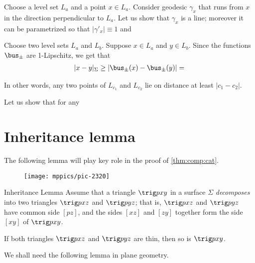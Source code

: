 Choose a level set $L_a$ and a point $x\in L_a$.
Consider geodesic $\gamma_x$ that runs from $x$ in the direction perpendicular to $L_a$.
Let us show that $\gamma_x$ is a line;
moreover it can be parametrized so that $|\gamma'_x|\equiv1$ and 

Choose two level sets $L_a$ and $L_b$.
Suppose $x\in L_a$ and $y\in L_b$.
Since the functions $\bus_\pm$ are 1-Lipschitz,
we get that 
\begin{align*}
|x-y|_\Sigma
\ge
|\bus_\pm(x)-\bus_\pm(y)|=
\end{align*}

In other words, any two points of $L_{c_1}$ and $L_{c_2}$ lie on distance at least $|c_1-c_2|$.

Let us show that for any


















\section{Inheritance lemma}

The following lemma will play key role in the proof of \ref{thm:comp:cat}.

\begin{wrapfigure}{r}{25mm}
\vskip-0mm
\centering
\texttt{[image: mppics/pic-2320]}
\end{wrapfigure}

\begin{thm}{Inheritance Lemma}
\label{lem:inherit-angle} 
Assume that a triangle $\trig p x y$ in a surface $\Sigma$ \emph{decomposes} 
into two triangles $\trig p x z$ and $\trig p y z$;
that is, $\trig p x z$ and $\trig p y z$ have common side $[p z]$, and the sides $[x z]$ and $[z y]$ together form the side $[x y]$ of $\trig p x y$.

If  both triangles $\trig p x z$ and $\trig p y z$ are thin, 
then so is  $\trig p x y$.
\end{thm} 

We shall need the following lemma in plane geometry.



